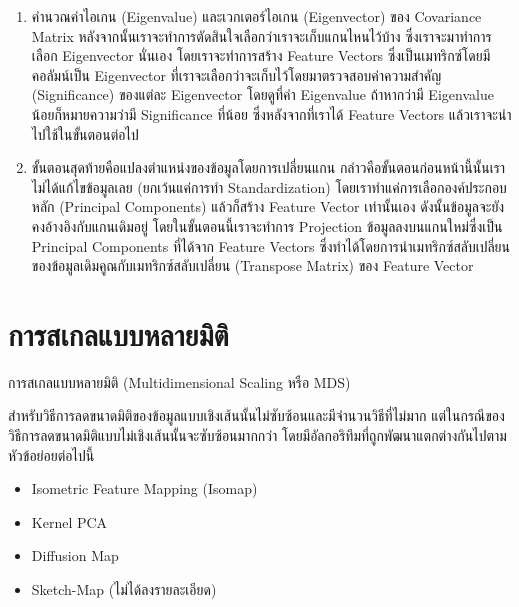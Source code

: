 \begin{enumerate}[topsep=0pt,noitemsep]
    \item คำนวณค่าไอเกน (Eigenvalue) และเวกเตอร์ไอเกน (Eigenvector) ของ Covariance Matrix หลังจากนั้นเราจะทำการตัดสินใจเลือกว่าเราจะเก็บแกนไหนไว้บ้าง ซึ่งเราจะมาทำการเลือก Eigenvector นั่นเอง โดยเราจะทำการสร้าง Feature Vectors ซึ่งเป็นเมทริกซ์โดยมีคอลัมน์เป็น Eigenvector ที่เราจะเลือกว่าจะเก็บไว้โดยมาตรวจสอบค่าความสำคัญ (Significance) ของแต่ละ Eigenvector โดยดูที่ค่า Eigenvalue ถ้าหากว่ามี Eigenvalue น้อยก็หมายความว่ามี Significance ที่น้อย ซึ่งหลังจากที่เราได้ Feature Vectors แล้วเราจะนำไปใช้ในขั้นตอนต่อไป

    \item ขั้นตอนสุดท้ายคือแปลงตำแหน่งของข้อมูลโดยการเปลี่ยนแกน กล่าวคือขั้นตอนก่อนหน้านี้นั้นเราไม่ได้แก้ไขข้อมูลเลย (ยกเว้นแค่การทำ Standardization) โดยเราทำแค่การเลือกองค์ประกอบหลัก (Principal Components) แล้วก็สร้าง Feature Vector เท่านั้นเอง ดังนั้นข้อมูลจะยังคงอ้างอิงกับแกนเดิมอยู่ โดยในขั้นตอนนี้เราจะทำการ Projection ข้อมูลลงบนแกนใหม่ซึ่งเป็น Principal Components ที่ได้จาก Feature Vectors ซึ่งทำได้โดยการนำเมทริกซ์สลับเปลี่ยนของข้อมูลเดิมคูณกับเมทริกซ์สลับเปลี่ยน (Transpose Matrix) ของ Feature Vector

\end{enumerate}

\section{การสเกลแบบหลายมิติ}
\label{sec:mds}

การสเกลแบบหลายมิติ (Multidimensional Scaling หรือ MDS)\autocite{young1938,torgerson1952}

สำหรับวิธีการลดขนาดมิติของข้อมูลแบบเชิงเส้นนั้นไม่ซับซ้อนและมีจำนวนวิธีที่ไม่มาก แต่ในกรณีของวิธีการลดขนาดมิติแบบไม่เชิงเส้นนั้นจะซับซ้อนมากกว่า โดยมีอัลกอริทึมที่ถูกพัฒนาแตกต่างกันไปตามหัวข้อย่อยต่อไปนี้\autocite{glielmo2021}
%
\begin{itemize}[topsep=0pt,noitemsep]\setlength\itemsep{0.5em}
    \item Isometric Feature Mapping (Isomap)

    \item Kernel PCA

    \item Diffusion Map

    \item Sketch-Map (ไม่ได้ลงรายละเอียด)
\end{itemize}

